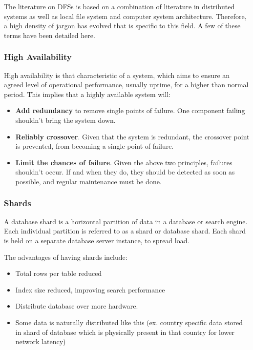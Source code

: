 \documentclass{article}
\begin{document}
The literature on DFSs is based on a combination of literature in distributed systems as well as local file system and computer system architecture. Therefore, a high density of jargon has evolved that is specific to this field. A few of these terms have been detailed here.


\subsubsection{High Availability}
High availability is that characteristic of a system, which aims to ensure an agreed level of operational performance, usually uptime, for a higher than normal period. This implies that a highly available system will:
    \begin{itemize}
        \item \textbf{Add redundancy} to remove single points of failure. One component failing shouldn't bring the system down.
        \item \textbf{Reliably crossover}. Given that the system is redundant, the crossover point is prevented, from becoming a single point of failure.
        \item \textbf{Limit the chances of failure}. Given the above two principles, failures shouldn't occur. If and when they do, they should be detected as soon as possible, and regular maintenance must be done. 
    \end{itemize}

\subsubsection{Shards}
A database shard is a horizontal partition of data in a database or search engine. Each individual partition is referred to as a shard or database shard. Each shard is held on a separate database server instance, to spread load.

The advantages of having shards include:
    \begin{itemize}
        \item Total rows per table reduced
        \item Index size reduced, improving search performance
        \item Distribute database over more hardware.
        \item Some data is naturally distributed like this (ex. country specific data stored in shard of database which is physically present in that country for lower network latency)
    \end{itemize}
\end{document}
